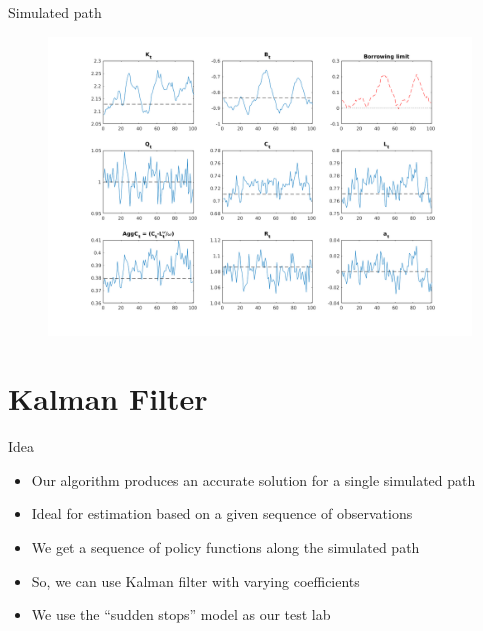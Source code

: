 \documentclass{beamer}
\begin{document}
\begin{frame}{Simulated path}

    \begin{figure}[htpb]
        \centering
        \includegraphics[width=1.0\linewidth]{sudden_stops_path}
        \label{fig:sudden_stops_path}
    \end{figure}
    
\end{frame}

\section{Kalman Filter}

\begin{frame}{Idea}
    \begin{itemize}
        \item Our algorithm produces an accurate solution for a single simulated path
            \bigskip
        \item Ideal for estimation based on a given sequence of observations
            \bigskip
        \item We get a sequence of policy functions along the simulated path
            \bigskip
        \item So, we can use Kalman filter with varying coefficients
            \bigskip
        \item We use the ``sudden stops'' model as our test lab
    \end{itemize}
\end{frame}
\end{document}
